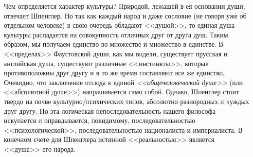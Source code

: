 Чем определяется характер культуры? Природой, лежащей в ея основании души, отвечает Шпенглер. Но так как каждый народ и даже сословие (не говоря уже об отдельном человеке) в свою очередь обладают <<душой>>, то единая душа культуры распадается на совокупность отличных друг от друга душ. Таким образом, мы получаем единство во множестве и множество в единстве. В <<пределах>> Фаустовской души, как мы видели, существует прусская и английская душа, существуют различные <<инстинкты>>, которые противоположны друг другу и в то же время составляют все же единство. Очевидно, что заключение отсюда к единой \emph{<<общечеловеческой душе>>} (или <<абсолютной душе>>) напрашивается само собой. Однако, Шпенглер стоит твердо на почве культурно\-/психических типов, абсолютно разнородных и чуждых друг другу. Но эта логическая непоследовательность нашего философа искупается и оправдывается, повидимому, последовательностью <<психологической>>, последовательностью националиста и империалиста. В конечном счете для Шпенглера истинной <<реальностью>> является <<душа>> его народа.

